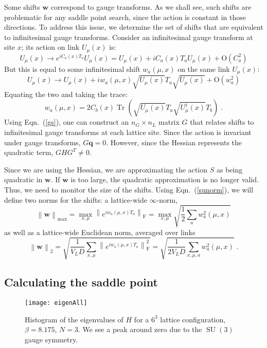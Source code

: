 \documentclass[preprint,aps,prd]{revtex4-2}
\newcommand{\da}{\dagger}  %
\newcommand{\be}{\begin{equation}}
\newcommand{\eq}{\end{equation}}
\DeclareMathOperator{\SU}{SU}
\DeclareMathOperator{\Tr}{Tr}
\newcommand\fnorm[1]{\left\lVert #1 \right\rVert_\mathrm{F}}
\begin{document}
Some shifts $\mathbf{w}$ correspond to gauge transforms.
As we shall see, such shifts are problematic for any saddle
point search, since the action is constant in those directions.
To address this issue, we determine the set of shifts that are
equivalent to infinitesimal gauge transforms.  Consider an
infinitesimal gauge transform at site $x$; its action on link $U_\mu(x)$ is:
\be
U_\mu(x) \to e^{i C_a(x) T_a} U_\mu(x) = U_\mu(x) + i C_a(x) T_a U_\mu(x) +
       \mathrm{O}\!\left(C_a^2\right)
\eq
But this is equal to some infinitesimal shift $w_a(\mu, x)$ on
the same link $U_\mu(x)$:
\be
U_\mu(x) \to U_\mu(x) + i w_a(\mu,x) \sqrt{U_\mu(x)}T_a \sqrt{U_\mu(x)} +
       \mathrm{O}\!\left(w_a^2\right)
\eq
%
Equating the two and taking the trace:
\be
w_a(\mu,x) = 2 C_b(x) \Tr\left(\sqrt{U_\mu(x)} T_a
                     \sqrt{U_\mu^\da(x)} T_b\right) \; . \label{gs}
\eq
Using Eqn.~(\ref{gs}), one can construct an $n_G \times n_L$ matrix
$G$ that relates shifts to infinitesimal gauge transforms
at each lattice site.
Since the action is invariant under gauge transforms, $G \mathbf{q} = 0$.
However, since the Hessian represents the quadratic term, $G H G^T \neq 0$.

Since we are using the Hessian, we are approximating
the action $S$ as being quadratic in $\mathbf{w}$.  If $\mathbf{w}$
is too large, the quadratic approximation is no longer valid.
Thus, we need to monitor the size of the shifts.
Using Eqn.~(\ref{sunorm}), we will define two norms for the shifts:
a lattice-wide $\infty$-norm,
\be
\left\lVert \mathbf{w}\right\rVert_{\mathrm{max}} =
     \max_{x,\mu} \fnorm{e^{i w_{a}(\mu, x) T_a}}
     = \max_{x,\mu} \sqrt{\frac{1}{2}\sum_a w_a^2(\mu, x)}
\eq
as well as a lattice-wide Euclidean norm, averaged over links
\be
\left\lVert \mathbf{w}\right\rVert_2 =
      \sqrt{\frac{1}{V_L D} \sum_{x, \mu}
        \fnorm{e^{i w_{a}(\mu, x) T_a}}^2}
     = \sqrt{\frac{1}{2 V_L D} \sum_{x, \mu, a} w_a^2(\mu, x)}
        \; .  \label{shiftsize}
\eq

\subsection{Calculating the saddle point}
\label{saddle}

\begin{figure}
\texttt{[image: eigenAll]}
\caption{Histogram of the eigenvalues of $H$ for a $6^3$
  lattice configuration, $\beta = 8.175$, $N=3$.
  We see a peak around zero due to the $\SU(3)$ gauge symmetry.
  \label{eigenAll}}
\end{figure}
\end{document}

